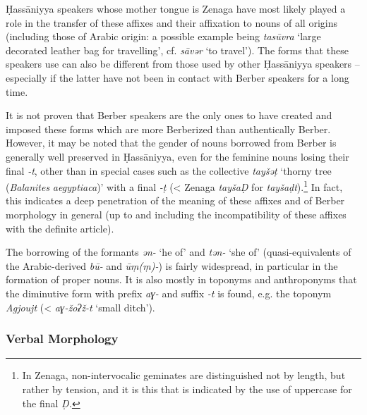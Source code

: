 \documentclass[output=paper]{langsci/langscibook}
\begin{document}
Ḥassāniyya speakers whose mother tongue is Zenaga have most likely played a role in the transfer of these affixes and their affixation to nouns of all origins (including those of Arabic origin: a possible example being \textit{tasūvra} ‘large decorated leather bag for travelling’, cf. \textit{sāvər} ‘to travel’). The forms that these speakers use can also be different from those used by other Ḥassāniyya speakers – especially if the latter have not been in contact with Berber speakers for a long time. 

It is not proven that Berber speakers are the only ones to have created and imposed these forms which are more Berberized than authentically Berber. However, it may be noted that the gender of nouns borrowed from Berber is generally well preserved in Ḥassāniyya, even for the feminine nouns losing their final \textit{{}-t}, other than in special cases such as the collective \textit{tayšəṭ} ‘thorny tree (\textit{Balanites} \textit{aegyptiaca})’ with a final \textit{{}-ṭ} (< Zenaga \textit{tayšaḌ} for \textit{tayšaḍt}).\footnote{In Zenaga, non-intervocalic geminates are distinguished not by length, but rather by tension, and it is this that is indicated by the use of uppercase for the final \textit{Ḍ.} } In fact, this indicates a deep penetration of the meaning of these affixes and of Berber morphology in general (up to and including the incompatibility of these affixes with the definite article). 

The borrowing of the formants \textit{ən-} ‘he of’ and \textit{tən-} ‘she of’ (quasi-equivalents of the Arabic-derived \textit{bū-} and \textit{ūṃ(ṃ)-}) is fairly widespread, in particular in the formation of proper nouns. It is also mostly in toponyms and anthroponyms that the diminutive form with prefix \textit{aɣ-} and suffix \textit{{}-t} is found, e.g. the toponym \textit{Agjoujt} (< \textit{aɣ-žoʔž-t} ‘small ditch’).

\subsubsection{Verbal Morphology} %

\label{sa}
\end{document}
